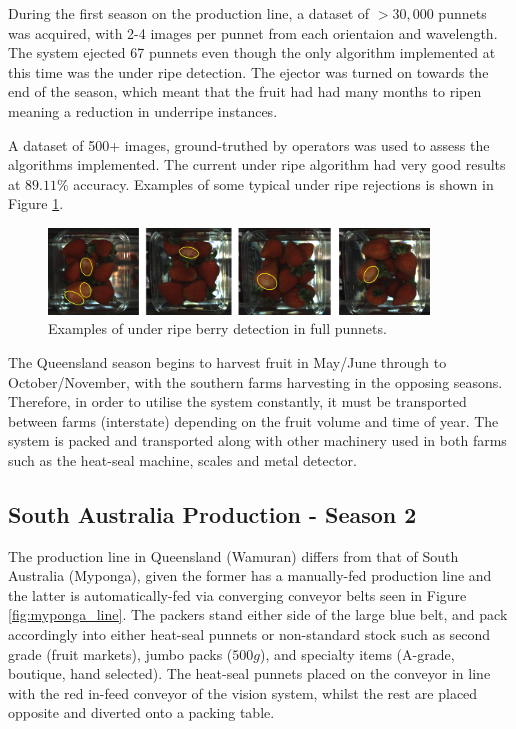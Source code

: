 \documentclass[fleqn,twoside]{article}
\begin{document}
During the first season on the production line, a dataset of $>30,000$ punnets was acquired, with 2-4 images per punnet from each orientaion and wavelength. The system ejected 67 punnets even though the only algorithm implemented at this time was the under ripe detection. The ejector was turned on towards the end of the season, which meant that the fruit had had many months to ripen meaning a reduction in underripe instances.  

A dataset of 500+ images, ground-truthed by operators was used to assess the algorithms implemented. The current under ripe algorithm had very good results at $89.11\%$ accuracy. Examples of some typical under ripe rejections is shown in Figure \ref{fig:UR_berries}.


\begin{figure}[h]
	\centering
	\includegraphics[width=0.9\textwidth]{UR_berries.png}
	\caption{Examples of under ripe berry detection in full punnets.}
	\label{fig:UR_berries}
\end{figure}


The Queensland season begins to harvest fruit in May/June through to October/November, with the southern farms harvesting in the opposing seasons. Therefore, in order to utilise the system constantly, it must be transported between farms (interstate) depending on the fruit volume and time of year. The system is packed and transported along with other machinery used in both farms such as the heat-seal machine, scales and metal detector. 



\subsection{South Australia Production - Season 2}


The production line in Queensland (Wamuran) differs from that of South Australia (Myponga), given the former has a manually-fed production line and the latter is automatically-fed via converging conveyor belts seen in Figure \ref{fig:myponga_line}. The packers stand either side of the large blue belt, and pack accordingly into either heat-seal punnets or non-standard stock such as second grade (fruit markets), jumbo packs ($500g$), and specialty items (A-grade, boutique, hand selected). The heat-seal punnets placed on the conveyor in line with the red in-feed conveyor of the vision system, whilst the rest are placed opposite and diverted onto a packing table. 
\end{document}
